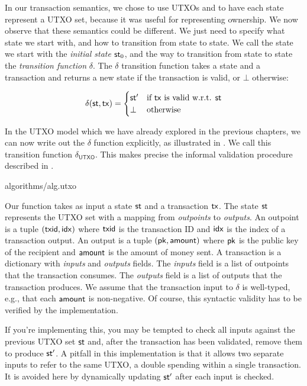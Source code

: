 In our transaction semantics, we chose to use UTXOs and to have each state represent a UTXO set,
because it was useful for representing ownership. We now observe that these semantics could be
different. We just need to specify what state we start with, and how to transition from state to state.
We call the state we start with the \emph{initial state} $\mathsf{st}_0$, and the way to transition from state
to state the \emph{transition function} $\delta$. The $\delta$ transition function takes a state and
a transaction and returns a new state if the transaction is valid, or $\bot$ otherwise:

\[
  \delta(\mathsf{st}, \mathsf{tx}) = \begin{cases}
    \mathsf{st}' & \text{if $\mathsf{tx}$ is valid w.r.t. $\mathsf{st}$} \\
    \bot & \text{otherwise} \\
  \end{cases}
\]

In the UTXO model which we have already explored in the previous chapters, we can now
write out the $\delta$ function explicitly, as illustrated in .
We call this transition function $\delta_{\textsf{UTXO}}$. This makes precise the informal
validation procedure described in .

{algorithms/alg.utxo}

Our function takes as input a state $\mathsf{st}$ and a transaction $\mathsf{tx}$. The state
$\mathsf{st}$ represents the UTXO set with a mapping from \emph{outpoints} to
\emph{outputs}. An outpoint is a tuple $(\mathsf{txid}, \mathsf{idx})$ where $\mathsf{txid}$ is the
transaction ID and $\mathsf{idx}$ is the index of a transaction output. An output is a
tuple $(\mathsf{pk}, \mathsf{amount})$ where $\mathsf{pk}$ is the public key of the recipient and
$\mathsf{amount}$ is the amount of money sent. A transaction is a dictionary with
\emph{inputs} and \emph{outputs} fields. The \emph{inputs} field is a list of
outpoints that the transaction consumes. The \emph{outputs} field is a list of
outputs that the transaction produces. We assume that the transaction input to
$\delta$ is well-typed, e.g., that each $\mathsf{amount}$ is non-negative. Of course,
this syntactic validity has to be verified by the implementation.

If you're implementing this, you may be tempted to check all inputs against the
previous UTXO set $\mathsf{st}$ and, after the transaction has been validated, remove
them to produce $\mathsf{st}'$.  A pitfall in this implementation is that it allows two
separate inputs to refer to the same UTXO, a double spending within a single
transaction. It is avoided here by dynamically updating $\mathsf{st}'$ after each input
is checked.

